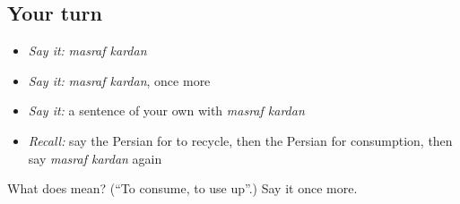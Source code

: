 \subsection*{Your turn}
\begin{itemize}
\raggedright
  \item \emph{Say it:} \emph{masraf kardan}
  \item \emph{Say it:} \emph{masraf kardan}, once more
  \item \emph{Say it:} a sentence of your own with \emph{masraf kardan}
  \item \emph{Recall:} say the Persian for to recycle, then the Persian for consumption, then say \emph{masraf kardan} again
\end{itemize}

\begin{tcolorbox}[breakable,colback=teal!4,colframe=teal!35!black,title={Before you move on}]
What does   mean? (\textquotedblleft{}To consume, to use up\textquotedblright{}.) Say it once more.
\end{tcolorbox}
